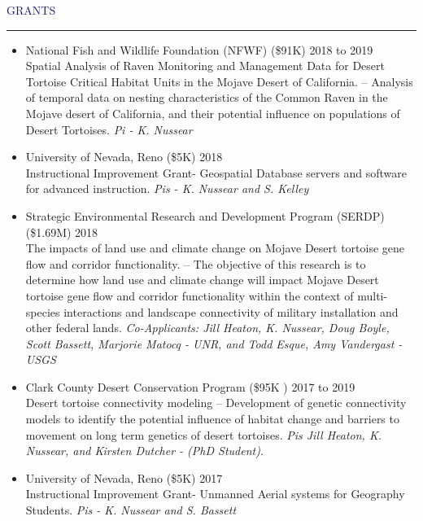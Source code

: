 \documentclass{resume} %
\renewenvironment{rSection}[1]{
\sectionskip
\textcolor{MidnightBlue}{\MakeUppercase{#1}}
\sectionlineskip
\hrule
\begin{list}{}{
\setlength{\leftmargin}{1.5em}
}
\item[]
}{
\end{list}
}
\begin{document}
\begin{rSection}{Grants}{}
\begin{itemize}
\item National Fish and Wildlife Foundation (NFWF) (\$91K) \hfill 2018 to 2019 \\
Spatial Analysis of Raven Monitoring and Management Data for Desert Tortoise Critical Habitat Units in the Mojave Desert of California. 
-- Analysis of temporal data on nesting characteristics of the Common Raven in the Mojave desert of California, and their potential influence on populations of Desert Tortoises. \textit{Pi - K. Nussear}

\item University of Nevada, Reno (\$5K) \hfill 2018 \\
Instructional Improvement Grant- Geospatial Database servers and software for advanced instruction. \textit{Pis - K. Nussear and S. Kelley}

\item Strategic Environmental Research and Development Program (SERDP) (\$1.69M) \hfill 2018 \\
The impacts of land use and climate change on Mojave Desert tortoise gene flow and corridor functionality.
-- The objective of this research is to determine how land use and climate change will impact Mojave Desert tortoise gene flow and corridor functionality within the context of multi-species interactions and landscape connectivity of military installation and other federal lands. \textit{Co-Applicants: Jill Heaton, K. Nussear, Doug Boyle, Scott Bassett, Marjorie Matocq - UNR, and Todd Esque, Amy Vandergast - USGS}

\item Clark County Desert Conservation Program (\$95K
) \hfill 2017 to 2019 \\
Desert tortoise connectivity modeling
 -- Development of genetic connectivity models to identify the potential influence of habitat change and barriers to movement on long term genetics of desert tortoises. \textit{Pis Jill Heaton, K. Nussear, and Kirsten Dutcher - (PhD Student)}.

\item University of Nevada, Reno (\$5K) \hfill 2017 \\
Instructional Improvement Grant- Unmanned Aerial systems for Geography Students. \textit{Pis - K. Nussear and S. Bassett}


\end{itemize}
\end{rSection}
\end{document}
